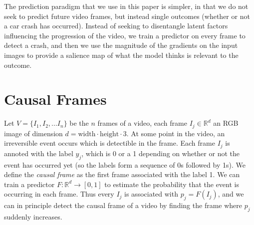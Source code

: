 \documentclass[letterpaper, twocolumn]{article} %
\begin{document}
The prediction paradigm that we use in this paper is simpler, in that we do not seek to predict future video frames, but instead single outcomes (whether or not a car crash has occurred). Instead of seeking to disentangle latent factors influencing the progression of the video, we train a predictor on every frame to detect a crash, and then we use the magnitude of the gradients on the input images to provide a salience map of what the model thinks is relevant to the outcome. %





\section{Causal Frames}
\label{sec:causal_frames}
Let $V = \{I_1, I_2, ... I_n\}$ be the $n$ frames of a video, each frame $I_j  \in \mathbb{R}^d$ an RGB image of dimension $d=\text{width}\cdot\text{height}\cdot 3$. At some point in the video, an irreversible event occurs which is detectible in the frame. Each frame $I_j$ is annoted with the label $y_j$, which is 0 or a 1 depending on whether or not the event has occurred yet (so the labels form a sequence of 0s followed by 1s). We define the \emph{causal frame} as the first frame associated with the label 1. We can train a predictor $F: \mathbb{R}^d \rightarrow [0,1]$ to estimate the probability that the event is occurring in each frame. Thus every $I_j$ is associated with $p_j = F(I_j)$, and we can in principle detect the causal frame of a video by finding the frame where $p_j$ suddenly increases.
\end{document}
